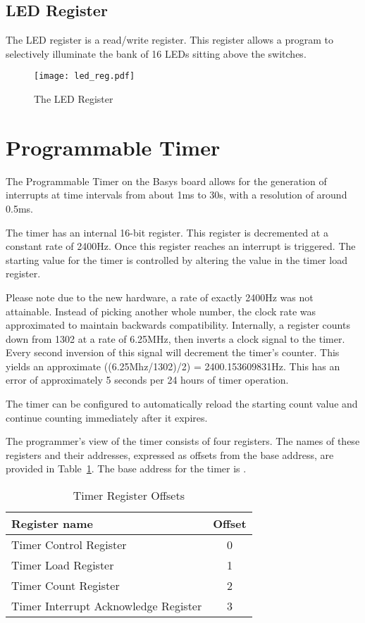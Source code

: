 \subsection{LED Register}

The LED register is a read/write register. This
register allows a program to selectively illuminate the bank of 16 LEDs
sitting above the switches.

\begin{figure}[h]
\begin{center}
\texttt{[image: led\_reg.pdf]}
\caption{The LED Register}
\label{LED_pic}
\end{center}
\end{figure}

\section{Programmable Timer}

The Programmable Timer on the Basys board allows for the generation of
interrupts at time intervals from about 1ms to 30s, with a resolution
of around 0.5ms.

The timer has an internal 16-bit register. This register is decremented
at a constant rate of 2400Hz. Once this register reaches
 an interrupt is triggered. The starting value for the
timer is controlled by altering the value in the timer load register.

Please note due to the new hardware, a rate of exactly 2400Hz was not attainable.
Instead of picking another whole number, the clock rate was approximated
to maintain backwards compatibility. Internally, a register counts down from 1302 
at a rate of 6.25MHz, then inverts a clock signal to the timer.
Every second inversion of this signal will decrement the timer's counter.
This yields an approximate ((6.25Mhz/1302)/2) = 2400.153609831Hz.
This has an error of approximately 5 seconds per 24 hours of timer operation.

The timer can be configured to automatically reload the starting count
value and continue counting immediately after it expires.

The programmer's view of the timer consists of four registers.  The
names of these registers and their addresses, expressed as offsets
from the base address, are provided in
Table~\ref{table:timer_offsets}.  The base address for the timer is
\src{\LOCTIMEBASE}.

\begin{table}[h]
\begin{center}
\begin{tabular}{|l|c|}
\hline
\textbf{Register name} & \textbf{Offset} \\
\hline
Timer Control Register & 0 \\
\hline
Timer Load Register & 1 \\
\hline
Timer Count Register & 2 \\
\hline
Timer Interrupt Acknowledge Register & 3 \\
\hline
\end{tabular}
\caption{Timer Register Offsets}
\label{table:timer_offsets}
\end{center}
\end{table}


